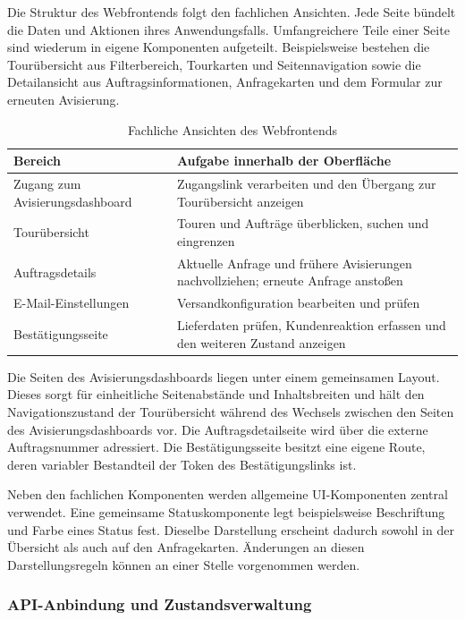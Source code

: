 Die Struktur des Webfrontends folgt den fachlichen Ansichten. Jede Seite bündelt die Daten und
Aktionen ihres Anwendungsfalls. Umfangreichere Teile einer Seite sind wiederum in eigene
Komponenten aufgeteilt. Beispielsweise bestehen die Tourübersicht aus Filterbereich, Tourkarten
und Seitennavigation sowie die Detailansicht aus Auftragsinformationen, Anfragekarten und dem
Formular zur erneuten Avisierung.

\begin{table}[htbp]
\centering
\begin{tabularx}{\textwidth}{@{}>{\raggedright\arraybackslash}p{}X@{}}
\toprule
Bereich & Aufgabe innerhalb der Oberfläche \\
\midrule
Zugang zum Avisierungsdashboard & Zugangslink verarbeiten und den Übergang zur Tourübersicht anzeigen \\
Tourübersicht & Touren und Aufträge überblicken, suchen und eingrenzen \\
Auftragsdetails & Aktuelle Anfrage und frühere Avisierungen nachvollziehen; erneute Anfrage anstoßen \\
E-Mail-Einstellungen & Versandkonfiguration bearbeiten und prüfen \\
Bestätigungsseite & Lieferdaten prüfen, Kundenreaktion erfassen und den weiteren Zustand anzeigen \\
\bottomrule
\end{tabularx}
\caption{Fachliche Ansichten des Webfrontends}
\label{tab:webfrontend-ansichten}
\end{table}

Die Seiten des Avisierungsdashboards liegen unter einem gemeinsamen Layout. Dieses sorgt für
einheitliche Seitenabstände und Inhaltsbreiten und hält den Navigationszustand der
Tourübersicht während des Wechsels zwischen den Seiten des Avisierungsdashboards vor. Die
Auftragsdetailseite wird über die externe Auftragsnummer adressiert. Die Bestätigungsseite
besitzt eine eigene Route, deren variabler Bestandteil der Token des Bestätigungslinks ist.

Neben den fachlichen Komponenten werden allgemeine UI-Komponenten zentral verwendet. Eine
gemeinsame Statuskomponente legt beispielsweise Beschriftung und Farbe eines Status fest.
Dieselbe Darstellung erscheint dadurch sowohl in der Übersicht als auch auf den Anfragekarten.
Änderungen an diesen Darstellungsregeln können an einer Stelle vorgenommen werden.

\subsubsection{API-Anbindung und Zustandsverwaltung}


